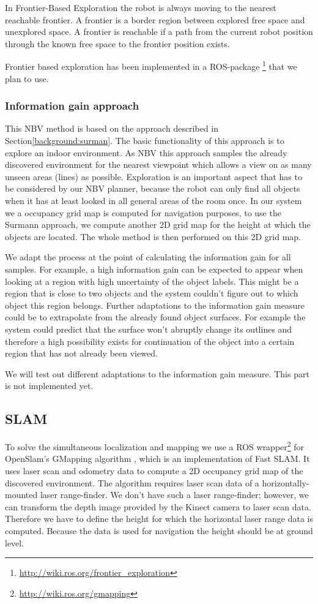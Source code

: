 \documentclass[a4paper,11pt,english]{article}
\begin{document}
In Frontier-Based Exploration the robot is always moving to the nearest reachable frontier.
A frontier is a border region between explored free space and unexplored space.
A frontier is reachable if a path from the current robot position through the known free space to the frontier position exists.

Frontier based exploration has been implemented in a ROS-package \footnote{\url{http://wiki.ros.org/frontier_exploration}} that we plan to use.

\subsubsection{Information gain approach}
This NBV method is based on the approach described in Section\ref{background:surman}.
The basic functionality of this approach is to explore an indoor environment.
As NBV this approach samples the already discovered environment for the nearest viewpoint which allows a view on as many unseen areas (lines) as possible.
Exploration is an important aspect that has to be considered by our NBV planner, because the robot can only find all objects when it has at least looked in all general areas of the room once.
In our system we a occupancy grid map is computed for navigation purposes, to use the Surmann approach, we compute another 2D grid map for the height at which the objects are located.
The whole method is then performed on this 2D grid map.

We adapt the process at the point of calculating the information gain for all samples.
For example, a high information gain can be expected to appear when looking at a region with high uncertainty of the object labels.
This might be a region that is close to two objects and the system couldn't figure out to which object this region belongs.
Further adaptations to the information gain measure could be to extrapolate from the already found object surfaces. 
For example the system could predict that the surface won't abruptly change its outlines and therefore a high possibility exists for continuation of the object into a certain region that has not already been viewed.

We will test out different adaptations to the information gain measure. This part is not implemented yet.

\subsection{SLAM}
\label{system:slam}
To solve the simultaneous localization and mapping we use a ROS wrapper\footnote{\url{http://wiki.ros.org/gmapping}} for OpenSlam's GMapping algorithm \cite{grisetti2007}, which is an implementation of Fast SLAM.
It uses laser scan and odometry data to compute a 2D occupancy grid map of the discovered environment.
The algorithm requires laser scan data of a horizontally-mounted laser range-finder.
We don't have such a laser range-finder; however, we can transform the depth image provided by the Kinect camera to laser scan data.
Therefore we have to define the height for which the horizontal laser range data is computed.
Because the data is used for navigation the height should be at ground level.
\end{document}
